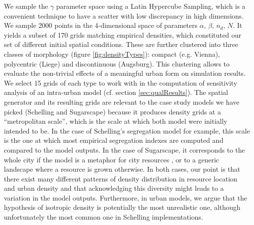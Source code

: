 \documentclass{JASSS}
\begin{document}
We sample the $\gamma$ parameter space using a Latin Hypercube Sampling, which is a convenient technique to have a scatter with low discrepancy in high dimensions. We sample 2000 points in the 4-dimensional space of parameters {$\alpha$, $\beta$, $n_d$, $N$}. It yields a subset of 170 grids matching empirical densities, which constituted our set of different initial spatial conditions. These are further clustered into three classes of morphology (figure \ref{fig:densityTypes}): compact (e.g. Vienna), polycentric (Liege) and discontinuous (Augsburg). This clustering allows to evaluate the non-trivial effects of a meaningful urban form on simulation results. We select 15 grids of each type to work with in the computation of sensitivity analysis of an intra-urban model (cf. section \ref{sec:qualResults}).
The spatial generator and its resulting grids are relevant to the case study models we have picked (Schelling and Sugarscape) because it produces density grids at a ``metropolitan scale'', which is the scale at which both model were initially intended to be. In the case of Schelling's segregation model for example, this scale is the one at which most empirical segregation indexes are computed and compared to the model outputs. In the case of Sugarscape, it corresponds to the whole city if the model is a metaphor for city resources \citep{batty2005agents}, or to a generic landscape where a resource is grown otherwise. In both cases, our point is that there exist many different patterns of density distribution in resource location and urban density and that acknowledging this diversity might leads to a variation in the model outputs. Furthermore, in urban models, we argue that the hypothesis of isotropic density is potentially the most unrealistic one, although unfortunately the most common one in Schelling implementations.
\end{document}
